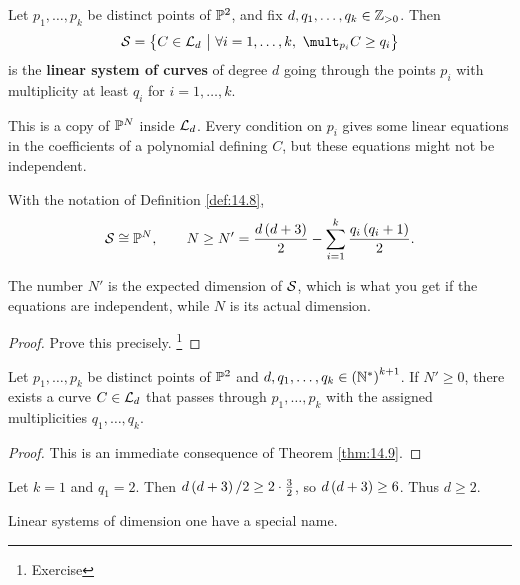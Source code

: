 
\begin{definition}
\label{def:14.8}
Let $ p_1, \dots, p_k $ be distinct points of $ \mathbb{P}^2 $, and fix $ d, q_1, \dots, q_k \in \mathbb{Z}_{> 0} $. Then
$$ \SSS = \cbr{C \in \LLL_d \st \forall i = 1, \dots, k, \ \mult_{p_i} C \ge q_i} $$
is the \textbf{linear system of curves} of degree $ d $ going through the points $ p_i $ with multiplicity at least $ q_i $ for $ i = 1, \dots, k $.
\end{definition}

This is a copy of $ \mathbb{P}^N $ inside $ \mathcal{L}_d $. Every condition on $ p_i $ gives some linear equations in the coefficients of a polynomial defining $ C $, but these equations might not be independent.

\begin{theorem}
\label{thm:14.9}
With the notation of Definition \ref{def:14.8},
$$ \SSS \cong \PP^N, \qquad N \ge N' = \dfrac{d\br{d + 3}}{2} - \sum_{i = 1}^k \dfrac{q_i\br{q_i + 1}}{2}. $$
\end{theorem}

The number $ N' $ is the expected dimension of $ \mathcal{S} $, which is what you get if the equations are independent, while $ N $ is its actual dimension.

\begin{proof}
Prove this precisely. \footnote{Exercise}
\end{proof}

\pagebreak

\begin{corollary}
Let $ p_1, \dots, p_k $ be distinct points of $ \mathbb{P}^2 $ and $ d, q_1, \dots, q_k \in \br{\NN^*}^{k + 1} $. If $ N' \ge 0 $, there exists a curve $ C \in \mathcal{L}_d $ that passes through $ p_1, \dots, p_k $ with the assigned multiplicities $ q_1, \dots, q_k $.
\end{corollary}

\begin{proof}
This is an immediate consequence of Theorem \ref{thm:14.9}.
\end{proof}

\begin{example*}
Let $ k = 1 $ and $ q_1 = 2 $. Then $ d\br{d + 3} / 2 \ge 2 \cdot \tfrac{3}{2} $, so $ d\br{d + 3} \ge 6 $. Thus $ d \ge 2 $.
\end{example*}

Linear systems of dimension one have a special name.

